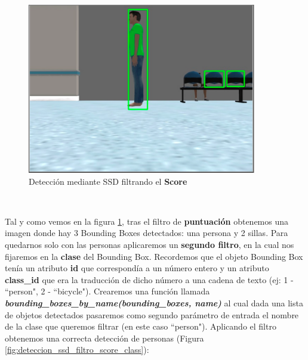 \begin{figure} [H]
  \begin{center}
    \includegraphics[width=10cm]{imagenes/deteccion-ssd-filtro-score.png}
  \end{center}
  \caption[Detección mediante SSD filtrando el \textbf{Score}]{Detección mediante SSD filtrando el \textbf{Score}}
  \label{fig:deteccion_ssd_filtro_score}
\end{figure}\

Tal y como vemos en la figura \ref{fig:deteccion_ssd_filtro_score}, tras el filtro de \textbf{puntuación} obtenemos una imagen donde hay 3 Bounding Boxes detectados: una persona y 2 sillas. Para quedarnos solo con las personas aplicaremos un \textbf{segundo filtro}, en la cual nos fijaremos en la \textbf{clase} del Bounding Box. Recordemos que el objeto Bounding Box tenía un atributo \textbf{id} que correspondía a un número entero y un atributo \textbf{class\_id} que era la traducción de dicho número a una cadena de texto (ej: 1 - ``person", 2 - ``bicycle"). Crearemos una función llamada \textbf{\textit{bounding\_boxes\_by\_name(bounding\_boxes, name)}} al cual dada una lista de objetos detectados pasaremos como segundo parámetro de entrada el nombre de la clase que queremos filtrar (en este caso ``person"). Aplicando el filtro obtenemos una correcta detección de personas (Figura \ref{fig:deteccion_ssd_filtro_score_class}):\\

